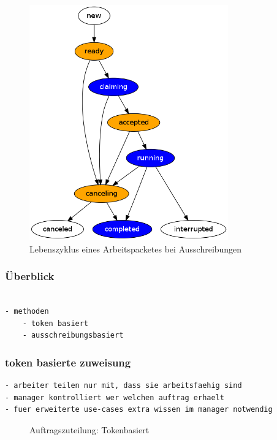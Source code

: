 \begin{figure}[ht] 
  \label{fig:lebenszyklus-arbeitspaket}
  \begin{center}
      \includegraphics[height=4in]{imageinput/lebenszyklus-arbeitspaket.png}
  \end{center}
  \caption{Lebenszyklus eines Arbeitspacketes bei Ausschreibungen}
\end{figure}



\subsubsection{\"Uberblick}

\begin{verbatim}

- methoden
    - token basiert
    - ausschreibungsbasiert

\end{verbatim}


\subsubsection{token basierte zuweisung}

\begin{verbatim}
- arbeiter teilen nur mit, dass sie arbeitsfaehig sind
- manager kontrolliert wer welchen auftrag erhaelt
- fuer erweiterte use-cases extra wissen im manager notwendig
\end{verbatim}

\begin{figure}[ht] 
  \label{fig:auftrag-zuteilung-token}
  \begin{sequencediagram}
  \end{sequencediagram}
  \caption{Auftragszuteilung: Tokenbasiert}
\end{figure}

